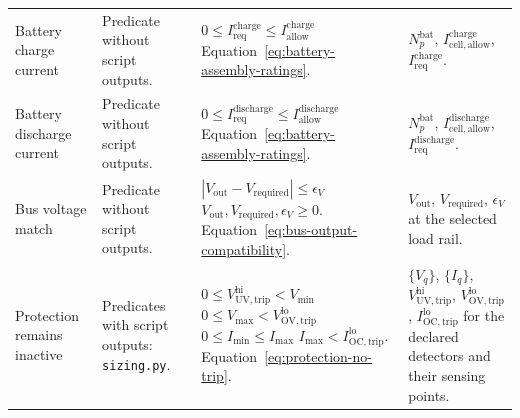 \begin{longtable}{@{}P{0.18\ReportTableBodyWidth}P{0.21\ReportTableBodyWidth}P{0.29\ReportTableBodyWidth}P{0.32\ReportTableBodyWidth}@{}}
\addlinespace[4pt]
Battery charge current & Predicate without script outputs. & $0\leq I_{\mathrm{req}}^{\mathrm{charge}}\leq I_{\mathrm{allow}}^{\mathrm{charge}}$ \newline Equation~\eqref{eq:battery-assembly-ratings}. & $N_p^{\mathrm{bat}}$, $I_{\mathrm{cell,allow}}^{\mathrm{charge}}$, $I_{\mathrm{req}}^{\mathrm{charge}}$. \\
\addlinespace[4pt]
Battery discharge current & Predicate without script outputs. & $0\leq I_{\mathrm{req}}^{\mathrm{discharge}}\leq I_{\mathrm{allow}}^{\mathrm{discharge}}$ \newline Equation~\eqref{eq:battery-assembly-ratings}. & $N_p^{\mathrm{bat}}$, $I_{\mathrm{cell,allow}}^{\mathrm{discharge}}$, $I_{\mathrm{req}}^{\mathrm{discharge}}$. \\
\addlinespace[4pt]
Bus voltage match & Predicate without script outputs. & $|V_{\mathrm{out}}-V_{\mathrm{required}}|\leq\epsilon_V$ \newline $V_{\mathrm{out}},V_{\mathrm{required}},\epsilon_V\geq0$. \newline Equation~\eqref{eq:bus-output-compatibility}. & $V_{\mathrm{out}}$, $V_{\mathrm{required}}$, $\epsilon_V$ at the selected load rail. \\
\addlinespace[4pt]
Protection remains inactive & Predicates with script outputs: \texttt{sizing.py}. & $0\leq V_{\mathrm{UV,trip}}^{\mathrm{hi}}<V_{\min}$ \newline $0\leq V_{\max}<V_{\mathrm{OV,trip}}^{\mathrm{lo}}$ \newline $0\leq I_{\min}\leq I_{\max}$ \newline $I_{\max}<I_{\mathrm{OC,trip}}^{\mathrm{lo}}$. \newline Equation~\eqref{eq:protection-no-trip}. & $\{V_q\}$, $\{I_q\}$, $V_{\mathrm{UV,trip}}^{\mathrm{hi}}$, $V_{\mathrm{OV,trip}}^{\mathrm{lo}}$, $I_{\mathrm{OC,trip}}^{\mathrm{lo}}$ for the declared detectors and their sensing points. \\
\end{longtable}
\endgroup
